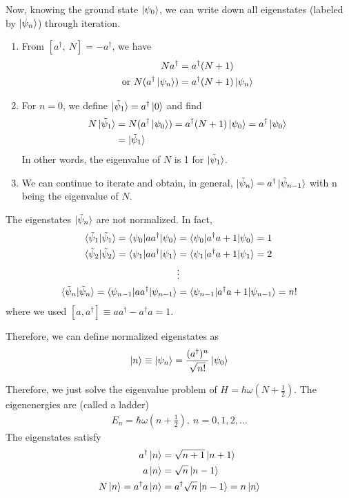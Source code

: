 Now, knowing the ground state $\ket{\psi_0}$, we can write down all eigenstates (labeled by $\ket{\psi_n}$) through iteration. 
\begin{enumerate}
    \item From $[a^\dagger,\ N]=-a^\dagger$, we have
    \begin{align*}
        N a^\dagger&= a^\dagger (N+1)\\
        \text{or }N(a^\dagger \ket{\psi_n})&=a^\dagger(N+1)\ket{\psi_n}
    \end{align*}
    \item For $n=0$, we define $\ket{\tilde{\psi}_1}=a^\dagger \ket{0}$ and find
    \begin{align*}
        N\ket{\tilde{\psi}_1}&=N(a^\dagger \ket{\psi_0})=a^\dagger(N+1)\ket{\psi_0}=a^\dagger \ket{\psi_0}\\
        &=\ket{\tilde{\psi}_1}
    \end{align*}
    In other words, the eigenvalue of $N$ is 1 for $\ket{\tilde{\psi}_1}$. 
    \item We can continue to iterate and obtain, in general, $\ket{\tilde{\psi}_n}=a^\dagger \ket{\tilde{\psi}_{n-1}}$ with n being the eigenvalue of $N$.
\end{enumerate}

The eigenstates $\ket{\tilde{\psi}_n}$ are not normalized. In fact,
\begin{align*}
    \braket{\tilde{\psi}_1|\tilde{\psi}_1}=\braket{\psi_0|aa^\dagger|\psi_0}&=\braket{\psi_0|a^\dagger a+1|\psi_0}=1\\
    \braket{\tilde{\psi}_2|\tilde{\psi}_2}=\braket{\psi_1|aa^\dagger|\psi_1}&=\braket{\psi_1|a^\dagger a+1|\psi_1}=2\\
    &\vdots \\
    \braket{\tilde{\psi}_n|\tilde{\psi}_n}=\braket{\psi_{n-1}|aa^\dagger|\psi_{n-1}}&=\braket{\psi_{n-1}|a^\dagger a+1|\psi_{n-1}}=n!
\end{align*}
where we used $[a, a^\dagger] ≡ aa^\dagger - a^\dagger a = 1$. 

Therefore, we can define normalized eigenstates as
\begin{align*}
    \ket{n}\equiv \ket{\psi_n}=\frac{(a^\dagger)^n}{\sqrt{n!}}\ket{\psi_0}
\end{align*}

Therefore, we just solve the eigenvalue problem of $H = \hbar \omega(N + \frac{1}{2})$. The eigenenergies are (called a ladder)
\begin{align*}
    E_n=\hbar\omega\left( n+\frac{1}{2} \right),\ n=0,1,2,\dots
\end{align*}
The eigenstates satisfy
\begin{align*}
    a^\dagger \ket{n}&=\sqrt{n+1}\ket{n+1}\\
    a\ket{n}&=\sqrt{n}\ket{n-1}\\
    N\ket{n}=a^\dagger  a\ket{n}&=a^\dagger \sqrt{n}\ket{n-1}=n\ket{n}
\end{align*}

